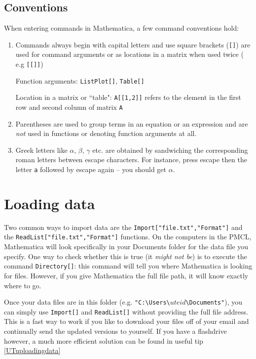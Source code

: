 \subsection{Conventions}
 When entering commands in Mathematica, a few command conventions hold:
\begin{enumerate}
\item Commands always begin with capital letters and use square brackets (\texttt{[]}) are used for command arguments or as locations in a matrix when used twice ( e.g \texttt{[[]]})
\begin{example} Function arguments: \texttt{ListPlot[]}, \texttt{Table[]} \end{example}
\begin{example} Location in a matrix or ``table":  \texttt{A[[1,2]]} refers to the element in the first row and second column of matrix \texttt{A} \end{example}
\item Parentheses are used to group terms in an equation or an expression and are \emph{not} used in functions or denoting function arguments at all.
\item Greek letters like $\alpha$, $\beta$, $\gamma$ etc. are obtained by sandwiching the corresponding roman letters between escape characters. For instance, press escape then the letter \texttt{a} followed by escape again -- you should get $\alpha$. 
\end{enumerate}


\section{Loading data}
\begin{sloppypar}
Two common ways to import data are the \texttt{Import["file.txt","Format"]} and the \texttt{ReadList["file.txt","Format"]} functions.  On the computers in the PMCL, Mathematica will look specifically in your Documents folder for the data file you specify. One way to check whether this is true (it {\it might not be}) is to execute  the command \texttt{Directory[]}: this command will tell you where Mathematica is looking for files. However, if you give Mathematica the full file path, it will know exactly where to go.
\end{sloppypar}
Once your data files are in this folder (e.g. \texttt{"C:\textbackslash Users\textbackslash}$uteid$\texttt{\textbackslash Documents"}), you can simply use \texttt{Import[]} and \texttt{ReadList[]} without providing the full file address. This is a fast way to work if you like to download your files off of your email and continually send the updated versions to yourself. If you have a flashdrive however, a much more efficient solution can be found in useful tip \ref{UTuploadingdata}

